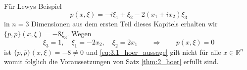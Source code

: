 \begin{exa}
Für Lewys Beispiel 
\begin{equation}
p(x,\xi)=-i\xi_1+\xi_2-2(x_1+ix_2)\xi_3
\end{equation}
in $n=3$ Dimensionen aus dem ersten Teil dieses Kapitels erhalten wir $\{p,\overline{p}\}(x,\xi)=-8\xi_3$. Wegen
\begin{equation}
\xi_3 =1,\quad \xi_1=-2x_2,\quad \xi_2=2x_1\qquad\Rightarrow\qquad p(x,\xi)=0
\end{equation}
ist $\{p,\overline{p}\}(x,\xi)=-8\neq 0$ und \eqref{eq:3.1_hoer_aussage} gilt nicht für alle $x\in\mathbb{R}^n$ womit folglich die Voraussetzungen von Satz \ref{thm:2_hoer} erfüllt sind.
\end{exa}